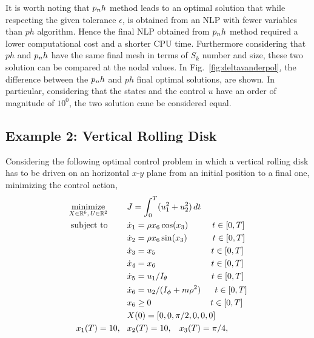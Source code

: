 It is worth noting that $p_{n}h$ method leads to an optimal solution that while respecting the given tolerance $\epsilon$, is obtained from an NLP with fewer variables than $ph$ algorithm.
Hence the final NLP obtained from $p_{n}h$ method required a lower computational cost and a shorter CPU time.
Furthermore considering that $ph$ and $p_{n}h$ have the same final mesh in terms of $S_k$ number and size, these two solution can be compared at the nodal values.
In Fig.~\ref{fig:deltavanderpol}, the difference between the $p_{n}h$ and $ph$ final optimal solutions, are shown.
In particular, considering that the states and the control $u$ have an order of magnitude of $10^{0}$, the two solution cane be considered equal.
\subsection*{Example 2: Vertical Rolling Disk}
Considering the following optimal control problem in which a vertical rolling disk has to be driven on an horizontal $x$-$y$ plane from an initial position to a final one, minimizing the control action,
\begin{subequations}\label{eq:disk}
	\begin{align}
	\underset{X \in \mathbb{R}^{6}, \, U \in \mathbb{R}^{2}}{\text{minimize}}\hspace{8mm}
	&J = \int_{0}^{T}(u_{1}^{2} +  u_{2}^{2})\,dt  \label{eq:diskcost}\\
	\text{subject to} \hspace{8mm}
	& \dot{x}_1 = \rho x_6  \cos(x_3) \hspace{10mm} t \in[0,T] \label{eq:diskdyn1}\\
	& \dot{x}_2 = \rho x_6  \sin(x_3)\hspace{10.5mm} t \in[0,T] \label{eq:diskdyn2}\\
	& \dot{x}_3 = x_5\hspace{23mm} t \in[0,T] \label{eq:diskdyn3}\\
	& \dot{x}_4 = x_6\hspace{23mm} t \in[0,T] \label{eq:diskdyn4}\\
	& \dot{x}_5 = u_1/I_{\theta}\hspace{18.2mm} t \in[0,T] \label{eq:diskdyn5}\\
	& \dot{x}_6 = u_2/(I_{\phi} + m \rho^{2})\hspace{5.8mm} t \in[0,T] \label{eq:diskdyn6}\\
	& x_6 \geq 0  \hspace{24.5mm} t \in[0,T]\\
	&X(0) = [0, 0, \pi/2, 0, 0, 0]\\	
	 x_1(T) = 10,\hspace{3mm} &x_2(T) = 10, \hspace{3mm} x_3(T) = \pi/4, \label{eq:diskfinal1}		
	\end{align}
\end{subequations}

